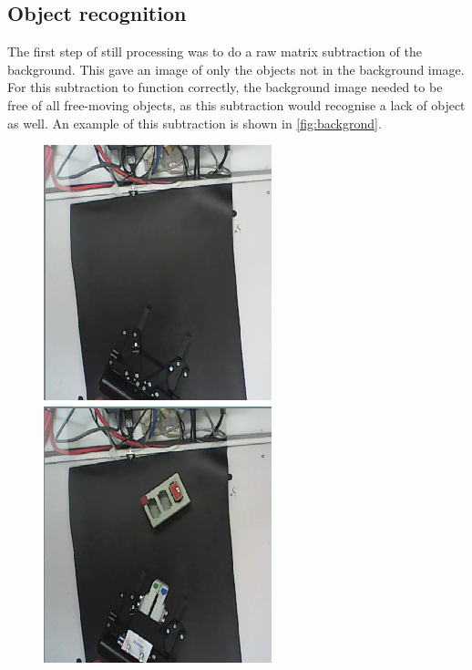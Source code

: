 \documentclass[11pt,a4paper]{report}
\begin{document}
\subsection{Object recognition}
The first step of still processing was to do a raw matrix subtraction of the background. This gave an image of only the objects not in the background image. For this subtraction to function correctly, the background image needed to be free of all free-moving objects, as this subtraction would recognise a lack of object as well. An example of this subtraction is shown in \cref{fig:backgrond}.\\
\begin{figure}
	\hspace*{-0.1\linewidth}
	\includegraphics[width=0.6\linewidth]{backgrond} %
		\includegraphics[width=0.6\linewidth]{base}\\
		\hspace*{0.2\linewidth}

\end{figure}
\end{document}
